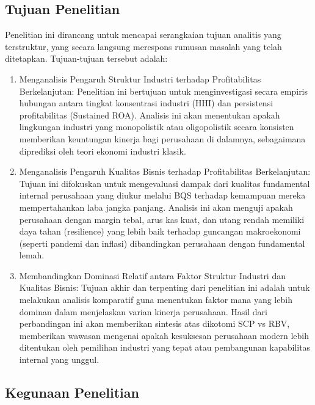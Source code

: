 \documentclass[12pt,a4paper]{report}
\providecommand{\tightlist}{%
  \setlength{\itemsep}{0pt}\setlength{\parskip}{0pt}%
}
\begin{document}
\hypertarget{tujuan-penelitian}{%
\subsection{Tujuan Penelitian}\label{tujuan-penelitian}}

Penelitian ini dirancang untuk mencapai serangkaian tujuan analitis yang
terstruktur, yang secara langsung merespons rumusan masalah yang telah
ditetapkan. Tujuan-tujuan tersebut adalah:

\begin{enumerate}
\def\labelenumi{\arabic{enumi}.}
\tightlist
\item
  Menganalisis Pengaruh Struktur Industri terhadap Profitabilitas
  Berkelanjutan: Penelitian ini bertujuan untuk menginvestigasi secara
  empiris hubungan antara tingkat konsentrasi industri (HHI) dan
  persistensi profitabilitas (Sustained ROA). Analisis ini akan
  menentukan apakah lingkungan industri yang monopolistik atau
  oligopolistik secara konsisten memberikan keuntungan kinerja bagi
  perusahaan di dalamnya, sebagaimana diprediksi oleh teori ekonomi
  industri klasik.
\item
  Menganalisis Pengaruh Kualitas Bisnis terhadap Profitabilitas
  Berkelanjutan: Tujuan ini difokuskan untuk mengevaluasi dampak dari
  kualitas fundamental internal perusahaan yang diukur melalui BQS
  terhadap kemampuan mereka mempertahankan laba jangka panjang. Analisis
  ini akan menguji apakah perusahaan dengan margin tebal, arus kas kuat,
  dan utang rendah memiliki daya tahan (resilience) yang lebih baik
  terhadap guncangan makroekonomi (seperti pandemi dan inflasi)
  dibandingkan perusahaan dengan fundamental lemah.
\item
  Membandingkan Dominasi Relatif antara Faktor Struktur Industri dan
  Kualitas Bisnis: Tujuan akhir dan terpenting dari penelitian ini
  adalah untuk melakukan analisis komparatif guna menentukan faktor mana
  yang lebih dominan dalam menjelaskan varian kinerja perusahaan. Hasil
  dari perbandingan ini akan memberikan sintesis atas dikotomi SCP vs
  RBV, memberikan wawasan mengenai apakah kesuksesan perusahaan modern
  lebih ditentukan oleh pemilihan industri yang tepat atau pembangunan
  kapabilitas internal yang unggul.
\end{enumerate}

\hypertarget{kegunaan-penelitian}{%
\subsection{Kegunaan Penelitian}\label{kegunaan-penelitian}}
\end{document}
